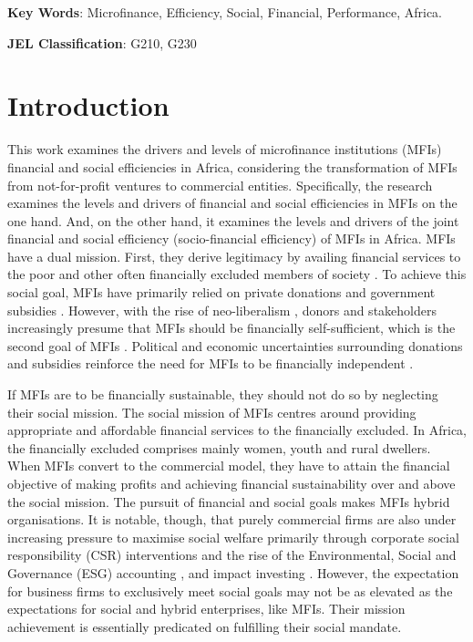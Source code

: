 \documentclass[a4paper, nobind]{templates/ociamthesis}
\begin{document}
\vspace{10mm}

\textbf{Key Words}: Microfinance, Efficiency, Social, Financial, Performance, Africa.

\vspace{5mm}

\textbf{JEL Classification}: G210, G230

\newpage

\hypertarget{introduction}{%
\section{Introduction}\label{introduction}}

This work examines the drivers and levels of microfinance institutions (MFIs) financial and social efficiencies in Africa, considering the transformation of MFIs from not-for-profit ventures to commercial entities. Specifically, the research examines the levels and drivers of financial and social efficiencies in MFIs on the one hand. And, on the other hand, it examines the levels and drivers of the joint financial and social efficiency (socio-financial efficiency) of MFIs in Africa. MFIs have a dual mission. First, they derive legitimacy by availing financial services to the poor and other often financially excluded members of society \autocite{marconatto2016going}. To achieve this social goal, MFIs have primarily relied on private donations and government subsidies \autocite{d2017ngos}. However, with the rise of neo-liberalism \autocite{bateman2010doesn}, donors and stakeholders increasingly presume that MFIs should be financially self-sufficient, which is the second goal of MFIs \autocite{beisland2019commercialization}. Political and economic uncertainties surrounding donations and subsidies reinforce the need for MFIs to be financially independent \autocite{armendariz2011mission,garmaise2013cheap}.

If MFIs are to be financially sustainable, they should not do so by neglecting their social mission. The social mission of MFIs centres around providing appropriate and affordable financial services to the financially excluded. In Africa, the financially excluded comprises mainly women, youth and rural dwellers. When MFIs convert to the commercial model, they have to attain the financial objective of making profits and achieving financial sustainability over and above the social mission. The pursuit of financial and social goals makes MFIs hybrid organisations. It is notable, though, that purely commercial firms are also under increasing pressure to maximise social welfare primarily through corporate social responsibility (CSR) interventions and the rise of the Environmental, Social and Governance (ESG) accounting \autocite{van2016esg}, and impact investing \autocite{barber2021impact}. However, the expectation for business firms to exclusively meet social goals may not be as elevated as the expectations for social and hybrid enterprises, like MFIs. Their mission achievement is essentially predicated on fulfilling their social mandate.
\end{document}

